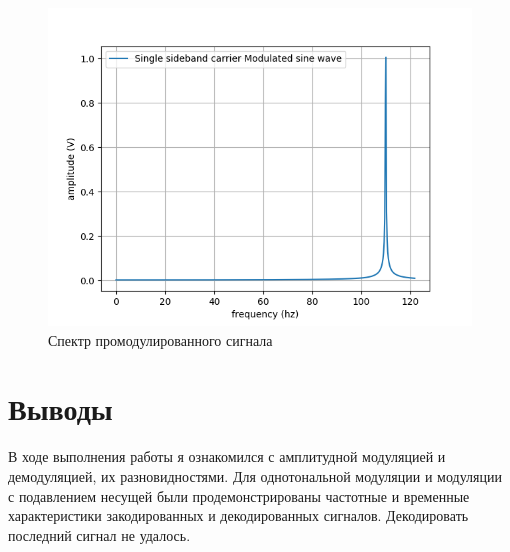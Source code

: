 \begin{figure}[H]
	\begin{center}
		\includegraphics[scale=0.7]{../out/Single_frequency.png}
		\caption{Спектр промодулированного сигнала} 
		\label{pic:sine_freq_2} %
	\end{center}
\end{figure}

\newpage
\section{Выводы}
В ходе выполнения работы я ознакомился с амплитудной модуляцией и демодуляцией, их разновидностями.
Для однотональной модуляции и модуляции с подавлением несущей были продемонстрированы частотные и временные характеристики закодированных и декодированных сигналов.
Декодировать последний сигнал не удалось.

